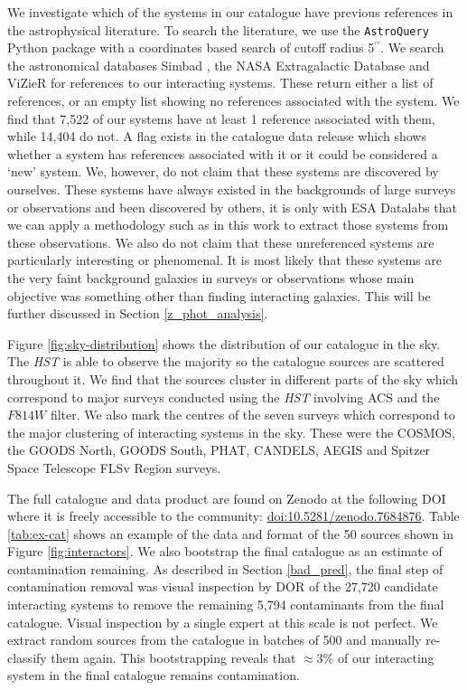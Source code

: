 {We investigate which of the systems in our catalogue have previous references in the astrophysical literature. To search the literature, we use the \texttt{AstroQuery} Python package with a coordinates based search of cutoff radius 5$^{\prime\prime}$. We search the astronomical databases Simbad \citep{simbad}, the NASA Extragalactic Database \citep[NED;][]{1991ASSL..171...89H} and ViZieR \citep{2000A&AS..143...23O} for references to our interacting systems. These return either a list of references, or an empty list showing no references associated with the system. We find that 7,522 of our systems have at least 1 reference associated with them, while 14,404 do not. A flag exists in the catalogue data release which shows whether a system has references associated with it or it could be considered a `new' system. We, however, do not claim that these systems are discovered by ourselves. These systems have always existed in the backgrounds of large surveys or observations and been discovered by others, it is only with ESA Datalabs that we can apply a methodology such as in this work to extract those systems from these observations. We also do not claim that these unreferenced systems are particularly interesting or phenomenal. It is most likely that these systems are the very faint background galaxies in surveys or observations whose main objective was something other than finding interacting galaxies. This will be further discussed in Section \ref{z_phot_analysis}.

Figure \ref{fig:sky-distribution} shows the distribution of our catalogue in the sky. The \emph{HST} is able to observe the majority so the catalogue sources are scattered throughout it. We find that the sources cluster in different parts of the sky which correspond to major surveys conducted using the \emph{HST} involving ACS and the $F814W$ filter. We also mark the centres of the seven surveys which correspond to the major clustering of interacting systems in the sky. These were the COSMOS, the GOODS North, GOODS South, PHAT, CANDELS, AEGIS and Spitzer Space Telescope FLSv Region \citep{2004A&A...424..371M} surveys.

The full catalogue and data product are found on Zenodo at the following DOI where it is freely accessible to the community: \href{https://doi.org/10.5281/zenodo.7684876}{doi:10.5281/zenodo.7684876}. Table \ref{tab:ex-cat} shows an example of the data and format of the 50 sources shown in Figure \ref{fig:interactors}. We also bootstrap the final catalogue as an estimate of contamination remaining. As described in Section \ref{bad_pred}, the final step of contamination removal was visual inspection by DOR of the 27,720 candidate interacting systems to remove the remaining 5,794 contaminants from the final catalogue. Visual inspection by a single expert at this scale is not perfect. We extract random sources from the catalogue in batches of 500 and manually re-classify them again. This bootstrapping reveals that $\approx$3\% of our interacting system in the final catalogue remains contamination.

}
